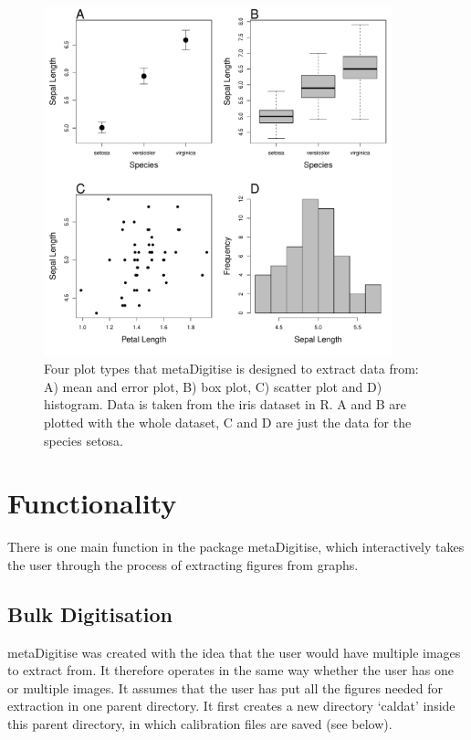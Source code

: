 \documentclass{article}
\begin{document}
\begin{figure}[ht] 
 \includegraphics[width=0.9\textwidth]{fig_plot_type.pdf} 
 \caption{Four plot types that metaDigitise is designed to extract data from: A) mean and error plot, B) box plot, C) scatter plot and D) histogram. Data is taken from the iris dataset in R. A and B are plotted with the whole dataset, C and D are just the data for the species setosa.}
\label{fig:plot_type}
\end{figure}

\section{Functionality}
There is one main function in the package metaDigitise, which interactively takes the user through the process of extracting figures from graphs.

\subsection{Bulk Digitisation}
metaDigitise was created with the idea that the user would have multiple images to extract from. It therefore operates in the same way whether the user has one or multiple images. It assumes that the user has put all the figures needed for extraction in one parent directory. It first creates a new directory `caldat' inside this parent directory, in which calibration files are saved (see below). 
\end{document}
